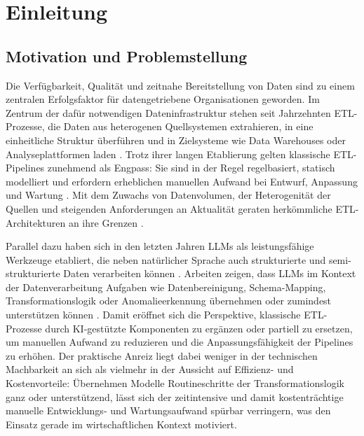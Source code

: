 ﻿%

\chapter{Einleitung}
\label{ch:einleitung}


\section{Motivation und Problemstellung}
\label{subsec:motivation}

Die Verfügbarkeit, Qualität und zeitnahe Bereitstellung von Daten sind zu einem zentralen Erfolgsfaktor für datengetriebene Organisationen geworden. Im Zentrum der dafür notwendigen Dateninfrastruktur stehen seit Jahrzehnten \ac{ETL}-Prozesse, die Daten aus heterogenen Quellsystemen extrahieren, in eine einheitliche Struktur überführen und in Zielsysteme wie Data Warehouses oder Analyseplattformen laden \autocite{khanOverviewETLTechniques2024,walhaDataIntegrationTraditional2024}. Trotz ihrer langen Etablierung gelten klassische \ac{ETL}-Pipelines zunehmend als Engpass: Sie sind in der Regel regelbasiert, statisch modelliert und erfordern erheblichen manuellen Aufwand bei Entwurf, Anpassung und Wartung \autocite{walhaDataIntegrationTraditional2024,nagabhyruBridgingTraditionalETL2022}. Mit dem Zuwachs von Datenvolumen, der Heterogenität der Quellen und steigenden Anforderungen an Aktualität geraten herkömmliche \ac{ETL}-Architekturen an ihre Grenzen \autocite{walhaDataIntegrationTraditional2024,raviETLExtractTransform2025}.

Parallel dazu haben sich in den letzten Jahren \acp{LLM} als leistungsfähige Werkzeuge etabliert, die neben natürlicher Sprache auch strukturierte und semi-strukturierte Daten verarbeiten können \autocite{zhaoSurveyLargeLanguage2026}. Arbeiten zeigen, dass \acp{LLM} im Kontext der Datenverarbeitung Aufgaben wie Datenbereinigung, Schema-Mapping, Transformationslogik oder Anomalieerkennung übernehmen oder zumindest unterstützen können \autocite{hassaniRoleChatGPTData2023,mumuniAutomatedDataProcessing2025}. Damit eröffnet sich die Perspektive, klassische \ac{ETL}-Prozesse durch \ac{KI}-gestützte Komponenten zu ergänzen oder partiell zu ersetzen, um manuellen Aufwand zu reduzieren und die Anpassungsfähigkeit der Pipelines zu erhöhen. Der praktische Anreiz liegt dabei weniger in der technischen Machbarkeit an sich als vielmehr in der Aussicht auf Effizienz- und Kostenvorteile: Übernehmen Modelle Routineschritte der Transformationslogik ganz oder unterstützend, lässt sich der zeitintensive und damit kostenträchtige manuelle Entwicklungs- und Wartungsaufwand spürbar verringern, was den Einsatz gerade im wirtschaftlichen Kontext motiviert.

